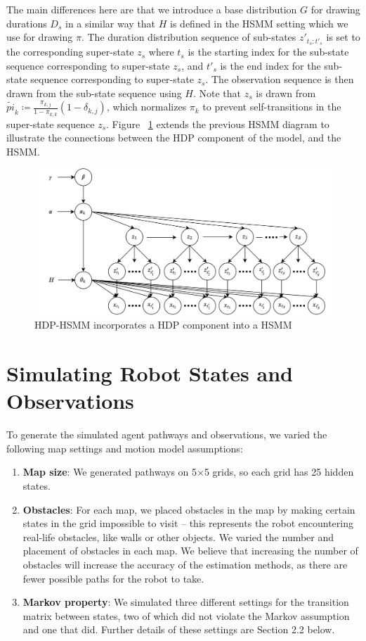 \documentclass{article}
\begin{document}
The main differences here are that we introduce a base distribution $G$ for drawing durations $D_s$ in a similar way that $H$ is defined in the HSMM setting which we use for drawing $\pi$. The duration distribution sequence of sub-states $z'_{t_{s}:t'_{s}}$ is set to the corresponding super-state $z_{s}$ where $t_{s}$ is the starting index for the sub-state sequence corresponding to super-state $z_s$, and $t'_{s}$ is the end index for the sub-state sequence corresponding to super-state $z_s$. The observation sequence is then drawn from the sub-state sequence using $H$. Note that $z_s$ is drawn from $\tilde{pi}_{k} \coloneqq \frac{\pi_{k,j}}{1-\pi_{k,k}}(1 - \delta_{k,j})$, which normalizes $\pi_k$ to prevent self-transitions in the super-state sequence $z_s$. Figure ~\ref{fig:hdphsmm} extends the previous HSMM diagram to illustrate the connections between the HDP component of the model, and the HSMM.

\begin{figure}[H]
\centering
\includegraphics[scale=0.12]{images/hdphsmm.png}
\caption{HDP-HSMM incorporates a HDP component into a HSMM}
\label{fig:hdphsmm}
\end{figure}

\section{Simulating Robot States and Observations}

To generate the simulated agent pathways and observations, we varied the following map settings and motion model assumptions:

\begin{enumerate}
	\item \textbf{Map size}: We generated pathways on 5$\times$5 grids, so each grid has 25 hidden states.
	\item \textbf{Obstacles}: For each map, we placed obstacles in the map by making certain states in the grid impossible to visit -- this represents the robot encountering real-life obstacles, like walls or other objects. We varied the number and placement of obstacles in each map. We believe that increasing the number of obstacles will increase the accuracy of the estimation methods, as there are fewer possible paths for the robot to take.
	\item \textbf{Markov property}: We simulated three different settings for the transition matrix between states, two of which did not violate the Markov assumption and one that did. Further details of these settings are Section 2.2 below.
\end{enumerate}
\end{document}
